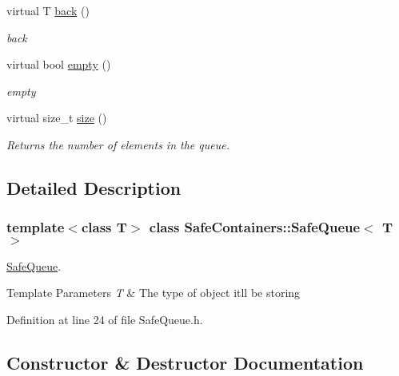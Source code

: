 \begin{DoxyCompactItemize}
virtual T \mbox{\hyperlink{classSafeContainers_1_1SafeQueue_add5f67af0bf71f6ddc19657768606a76}{back}} ()
\begin{DoxyCompactList}\small\item\em back \end{DoxyCompactList}\item 
virtual bool \mbox{\hyperlink{classSafeContainers_1_1SafeQueue_a9618125c76454aca006273dd22af2e77}{empty}} ()
\begin{DoxyCompactList}\small\item\em empty \end{DoxyCompactList}\item 
virtual size\+\_\+t \mbox{\hyperlink{classSafeContainers_1_1SafeQueue_a1dec91dd07140277a71ddfffd65565df}{size}} ()
\begin{DoxyCompactList}\small\item\em Returns the number of elements in the queue. \end{DoxyCompactList}\end{DoxyCompactItemize}


\subsection{Detailed Description}
\subsubsection*{template$<$class T$>$\newline
class Safe\+Containers\+::\+Safe\+Queue$<$ T $>$}

\mbox{\hyperlink{classSafeContainers_1_1SafeQueue}{Safe\+Queue}}. 


\begin{DoxyTemplParams}{Template Parameters}
{\em T} & The type of object it\textquotesingle{}ll be storing \\
\hline
\end{DoxyTemplParams}


Definition at line 24 of file Safe\+Queue.\+h.



\subsection{Constructor \& Destructor Documentation}
\mbox{\label{classSafeContainers_1_1SafeQueue_a1277b40465c772d1c4259d3e60f13b32}} 
